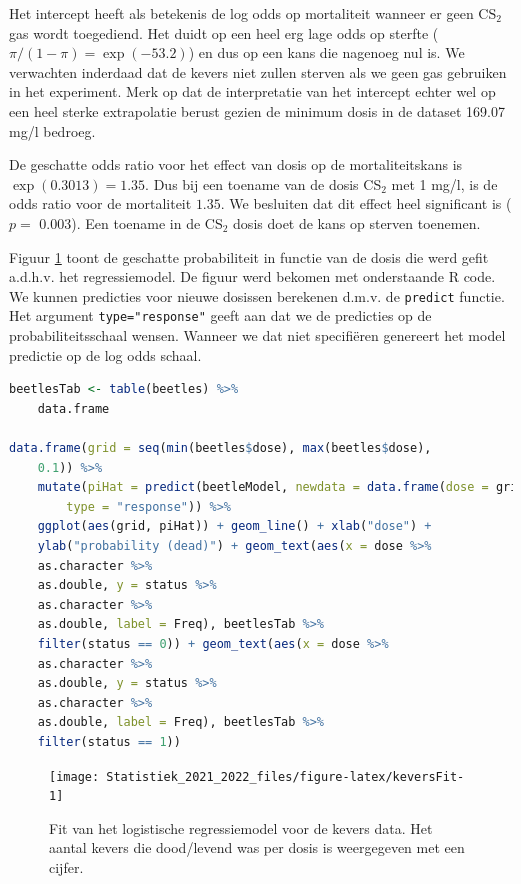 \documentclass[
  12pt,dutch,coursenotes]{book}
\newcommand{\passthrough}[1]{#1}
\theoremstyle{definition}
\theoremstyle{definition}
\theoremstyle{definition}
\theoremstyle{definition}
\theoremstyle{remark}
\begin{document}
Het intercept heeft als betekenis de log odds op mortaliteit wanneer er geen \(\text{CS}_2\) gas wordt toegediend.
Het duidt op een heel erg lage odds op sterfte (\(\pi/(1-\pi)=\exp(-53.2)\)) en dus op een kans die nagenoeg nul is.
We verwachten inderdaad dat de kevers niet zullen sterven als we geen gas gebruiken in het experiment.
Merk op dat de interpretatie van het intercept echter wel op een heel sterke extrapolatie berust gezien de minimum dosis in de dataset 169.07 mg/l bedroeg.

De geschatte odds ratio voor het effect van dosis op de mortaliteitskans is \(\exp(0.3013)=1.35\). Dus bij een toename van de dosis CS\(_2\) met 1 mg/l, is de odds ratio voor de mortaliteit \(1.35\). We besluiten dat dit effect heel significant is (\(p=\) 0.003). Een toename in de CS\(_2\) dosis doet de kans op sterven toenemen.

Figuur \ref{fig:keversFit} toont de geschatte probabiliteit in functie van de dosis die werd gefit a.d.h.v. het regressiemodel. De figuur werd bekomen met onderstaande R code.
We kunnen predicties voor nieuwe dosissen berekenen d.m.v. de \passthrough{\lstinline!predict!} functie.
Het argument \passthrough{\lstinline!type="response"!} geeft aan dat we de predicties op de probabiliteitsschaal wensen.
Wanneer we dat niet specifiëren genereert het model predictie op de log odds schaal.

\begin{lstlisting}[language=R]
beetlesTab <- table(beetles) %>%
    data.frame

data.frame(grid = seq(min(beetles$dose), max(beetles$dose),
    0.1)) %>%
    mutate(piHat = predict(beetleModel, newdata = data.frame(dose = grid),
        type = "response")) %>%
    ggplot(aes(grid, piHat)) + geom_line() + xlab("dose") +
    ylab("probability (dead)") + geom_text(aes(x = dose %>%
    as.character %>%
    as.double, y = status %>%
    as.character %>%
    as.double, label = Freq), beetlesTab %>%
    filter(status == 0)) + geom_text(aes(x = dose %>%
    as.character %>%
    as.double, y = status %>%
    as.character %>%
    as.double, label = Freq), beetlesTab %>%
    filter(status == 1))
\end{lstlisting}

\begin{figure}

{\centering \texttt{[image: Statistiek\_2021\_2022\_files/figure-latex/keversFit-1]} 

}

\caption{Fit van het logistische regressiemodel voor de kevers data. Het aantal kevers die dood/levend was per dosis is weergegeven met een cijfer.}\label{fig:keversFit}
\end{figure}
\end{document}
